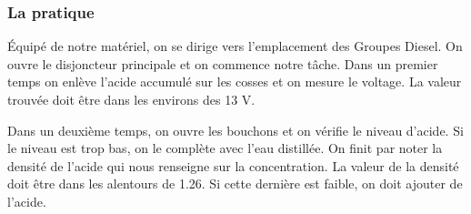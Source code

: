 \subsubsection{La pratique}
Équipé de notre matériel, on se dirige vers l'emplacement des Groupes Diesel.
On ouvre le disjoncteur principale et on commence notre tâche.
Dans un premier temps on enlève l'acide accumulé sur les cosses et on mesure le voltage. La valeur trouvée doit être dans les environs des 13 V.

Dans un deuxième temps, on ouvre les bouchons et on vérifie le niveau d'acide. Si le niveau est trop bas, on le complète avec l'eau distillée. On finit par noter la densité de l'acide qui nous renseigne sur la concentration. La valeur de la densité doit être dans les alentours de 1.26. Si cette dernière est faible, on doit ajouter de l'acide. 
